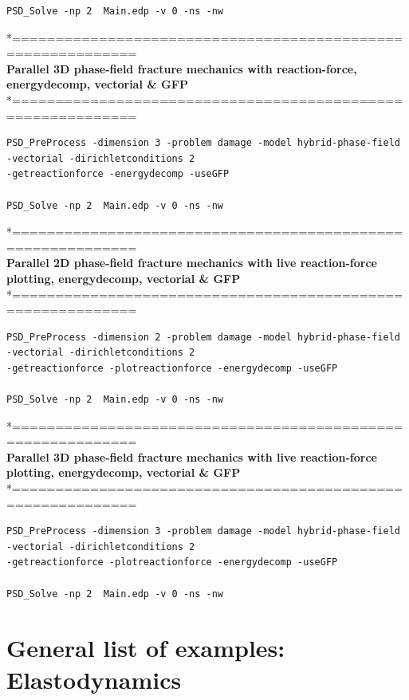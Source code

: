 {{\begin{lstlisting}[style=Linux]
PSD_Solve -np 2  Main.edp -v 0 -ns -nw   
\end{lstlisting}
*============================================================\\
\textbf{ Parallel 3D phase-field fracture mechanics with reaction-force, energydecomp, vectorial \& GFP} \\
*============================================================\\
\begin{lstlisting}[style=Linux]
PSD_PreProcess -dimension 3 -problem damage -model hybrid-phase-field -vectorial -dirichletconditions 2 
-getreactionforce -energydecomp -useGFP   

PSD_Solve -np 2  Main.edp -v 0 -ns -nw   	
\end{lstlisting}
*============================================================\\
 \textbf{Parallel 2D phase-field fracture mechanics with live reaction-force plotting, energydecomp, vectorial \& GFP} \\
*============================================================\\
\begin{lstlisting}[style=Linux]
PSD_PreProcess -dimension 2 -problem damage -model hybrid-phase-field -vectorial -dirichletconditions 2 
-getreactionforce -plotreactionforce -energydecomp -useGFP  

PSD_Solve -np 2  Main.edp -v 0 -ns -nw   
\end{lstlisting}
*============================================================\\
\textbf{ Parallel 3D phase-field fracture mechanics with live reaction-force plotting, energydecomp, vectorial \& GFP} \\
*============================================================\\
\begin{lstlisting}[style=Linux]
PSD_PreProcess -dimension 3 -problem damage -model hybrid-phase-field -vectorial -dirichletconditions 2 
-getreactionforce -plotreactionforce -energydecomp -useGFP   

PSD_Solve -np 2  Main.edp -v 0 -ns -nw   	
\end{lstlisting}

\section{General list of examples: Elastodynamics}

}}
